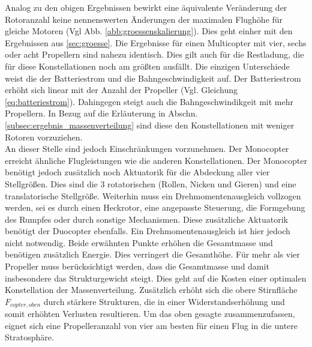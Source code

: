 Analog zu den obigen Ergebnissen bewirkt eine äquivalente Veränderung der Rotoranzahl keine nennenswerten Änderungen der maximalen Flughöhe für gleiche Motoren (Vgl Abb. \ref{abb:groessenskalierung}). Dies geht einher mit den Ergebnissen aus \ref{sec:groesse}. Die Ergebnisse für einen Multicopter mit vier, sechs oder acht Propellern sind nahezu identisch. Dies gilt auch für die Restladung, die für diese Konstellationen noch am größten ausfällt. Die einzigen Unterschiede weist die der Batteriestrom und die Bahngeschwindigkeit auf. Der Batteriestrom erhöht sich linear mit der Anzahl der Propeller (Vgl. Gleichung \ref{eq:batteriestrom}). Dahingegen steigt auch die Bahngeschwindikgeit mit mehr Propellern. 
In Bezug auf die Erläuterung in Abschn. \ref{subsec:ergebnis_massenverteilung} sind diese den Konstellationen mit weniger Rotoren vorzuziehen. \\
An dieser Stelle sind jedoch Einschränkungen vorzunehmen. 
Der Monocopter erreicht ähnliche Flugleistungen wie die anderen Konstellationen. Der Monocopter benötigt jedoch zusätzlich noch Aktuatorik für die Abdeckung aller vier Stellgrößen. Dies sind die 3 rotatorischen (Rollen, Nicken und Gieren) und eine translatorische Stellgröße. Weiterhin muss ein Drehmomentenausgleich vollzogen werden, sei es durch einen Heckrotor, eine angepasste Steuerung, die Formgebung des Rumpfes oder durch sonstige Mechanismen. Diese zusätzliche Aktuatorik benötigt der Duocopter ebenfalls. Ein Drehmomentenausgleich ist hier jedoch nicht notwendig.
Beide erwähnten Punkte erhöhen die Gesamtmasse und benötigen zusätzlich Energie. Dies verringert die Gesamthöhe. 
Für mehr als vier Propeller muss berücksichtigt werden, dass die Gesamtmasse und damit insbesondere das Strukturgewicht steigt. Dies geht auf die Kosten einer optimalen Konstellation der Massenverteilung. Zusätzlich erhöht sich die obere Stirnfläche \ensuremath{F_{copter,oben}} durch stärkere Strukturen, die in einer Widerstandserhöhung und somit erhöhten Verlusten resultieren. Um das oben gesagte zusammenzufassen, eignet sich eine Propelleranzahl von vier am besten für einen Flug in die untere Stratosphäre. 



